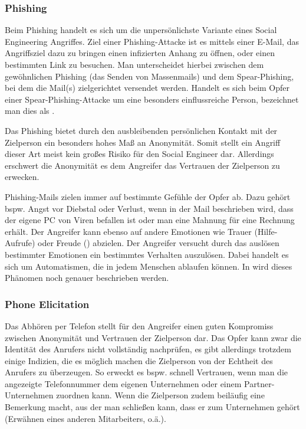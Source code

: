 \subsubsection{Phishing}
Beim Phishing handelt es sich um die unpersönlichste Variante eines Social Engineering Angriffes.
Ziel einer Phishing-Attacke ist es mittels einer E-Mail, das Angriffsziel dazu zu bringen einen infizierten Anhang zu öffnen, oder einen bestimmten Link zu besuchen. Man unterscheidet hierbei zwischen dem gewöhnlichen Phishing (das Senden von Massenmails) und dem Spear-Phishing, bei dem die Mail(s) zielgerichtet versendet werden. Handelt es sich beim Opfer einer Spear-Phishing-Attacke um eine besonders einflussreiche Person, bezeichnet man dies als . \citep{hadnagy}

Das Phishing bietet durch den ausbleibenden persönlichen Kontakt mit der Zielperson ein besonders hohes Maß an Anonymität. Somit stellt ein Angriff dieser Art meist kein großes Risiko für den Social Engineer dar.
Allerdings erschwert die Anonymität es dem Angreifer das Vertrauen der Zielperson zu erwecken.
\citep{hacking-the-human}

Phishing-Mails zielen immer auf bestimmte Gefühle der Opfer ab. Dazu gehört bspw. Angst vor Diebstal oder Verlust, wenn in der Mail beschrieben wird, dass der eigene PC von Viren befallen ist oder man eine Mahnung für eine Rechnung erhält.
Der Angreifer kann ebenso auf andere Emotionen wie Trauer (Hilfe-Aufrufe) oder Freude () abzielen.
Der Angreifer versucht durch das auslösen bestimmter Emotionen ein bestimmtes Verhalten auszulösen. Dabei handelt es sich um Automatismen, die in jedem Menschen ablaufen können. In  wird dieses Phänomen noch genauer beschrieben werden. \citep{hadnagy}


\subsubsection{Phone Elicitation}\label{sec:phone-elicitation}
Das Abhören per Telefon stellt für den Angreifer einen guten Kompromiss zwischen Anonymität und Vertrauen der Zielperson dar. Das Opfer kann zwar die Identität des Anrufers nicht vollständig nachprüfen, es gibt allerdings trotzdem einige Indizien, die es möglich machen die Zielperson von der Echtheit des Anrufers zu überzeugen. So erweckt es bspw. schnell Vertrauen, wenn man die angezeigte Telefonnummer dem eigenen Unternehmen oder einem Partner-Unternehmen zuordnen kann. Wenn die Zielperson zudem beiläufig eine Bemerkung macht, aus der man schließen kann, dass er zum Unternehmen gehört (Erwähnen eines anderen Mitarbeiters, o.ä.).

